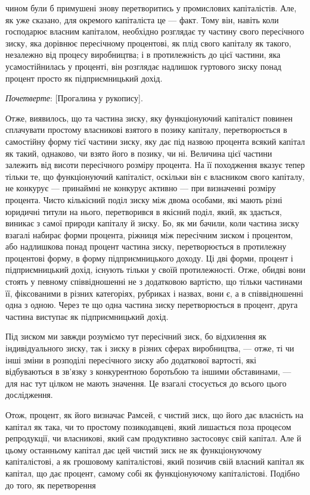 \parcont{}  %
чином були б примушені знову перетворитись у промислових
капіталістів. Але, як уже сказано, для окремого капіталіста
це — факт. Тому він, навіть коли господарює власним капіталом,
необхідно розглядає ту частину свого пересічного зиску,
яка дорівнює пересічному процентові, як плід свого капіталу
як такого, незалежно від процесу виробництва; і в протилежність
до цієї частини, яка усамостійнилась у проценті, він розглядає
надлишок гуртового зиску понад процент просто як підприємницький
дохід.

\emph{Почетверте}: [Прогалина у рукопису].

Отже, виявилось, що та частина зиску, яку функціонуючий
капіталіст повинен сплачувати простому власникові взятого в позику
капіталу, перетворюється в самостійну форму тієї частини
зиску, яку дає під назвою процента всякий капітал як
такий, однаково, чи взято його в позику, чи ні. Величина цієї
частини залежить від висоти пересічного розміру процента.
На її походження вказує тепер тільки те, що функціонуючий
капіталіст, оскільки він є власником свого капіталу, не конкурує
— принаймні не конкурує активно — при визначенні розміру
процента. Чисто кількісний поділ зиску між двома особами, які
мають різні юридичні титули на нього, перетворився в якісний
поділ, який, як здається, виникає з самої природи капіталу
й зиску. Бо, як ми бачили, коли частина зиску взагалі набирає
форми процента, ріжниця між пересічним зиском і процентом,
або надлишкова понад процент частина зиску, перетворюється
в протилежну процентові форму, в форму підприємницького
доходу. Ці дві форми, процент і підприємницький дохід, існують
тільки у своїй протилежності. Отже, обидві вони стоять у певному
співвідношенні не з додатковою вартістю, що тільки частинами
її, фіксованими в різних категоріях, рубриках і назвах,
вони є, а в співвідношенні одна з одною. Через те що одна
частина зиску перетворюється в процент, друга частина виступає
як підприємницький дохід.

Під зиском ми завжди розуміємо тут пересічний зиск, бо
відхилення як індивідуального зиску, так і зиску в різних сферах
виробництва, — отже, ті чи інші зміни в розподілі пересічного
зиску або додаткової вартості, які відбуваються в зв’язку
з конкурентною боротьбою та іншими обставинами, — для нас
тут цілком не мають значення. Це взагалі стосується до всього
цього дослідження.

Отож, процент, як його визначає Рамсей, є чистий зиск, що
його дає власність на капітал як така, чи то простому позикодавцеві,
який лишається поза процесом репродукції, чи власникові,
який сам продуктивно застосовує свій капітал. Але й цьому
останньому капітал дає цей чистий зиск не як функціонуючому
капіталістові, а як грошовому капіталістові, який позичив свій
власний капітал як капітал, що дає процент, самому собі як
функціонуючому капіталістові. Подібно до того, як перетворення
\parbreak{}  %
